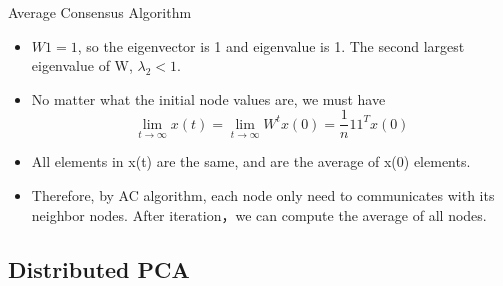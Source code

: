 \documentclass{beamer}
\begin{document}
\begin{frame}{Average Consensus Algorithm}
	\begin{itemize}
		\item{
			$ W1 = 1 $, so the eigenvector is 1 and eigenvalue is 1. The second largest eigenvalue of W, $ {\lambda _2} < 1 $. 
		}
		\item{
			No matter what the initial node values are, we must have
			\[\mathop {\lim }\limits_{t \to \infty } x(t) = \mathop {\lim }\limits_{t \to \infty } {W^t}x(0) = \frac{1}{n}{11^T}x(0)\]
		}
		\item{
		 	All elements in x(t) are the same, and are the average of x(0) elements.
			
		}
		\item{
			Therefore, by AC algorithm, each node only need to communicates with its neighbor nodes. After iteration，we can compute the average of all nodes.
		}
	\end{itemize}
\end{frame}


%			
%		
%

\subsection{Distributed PCA}
\end{document}
